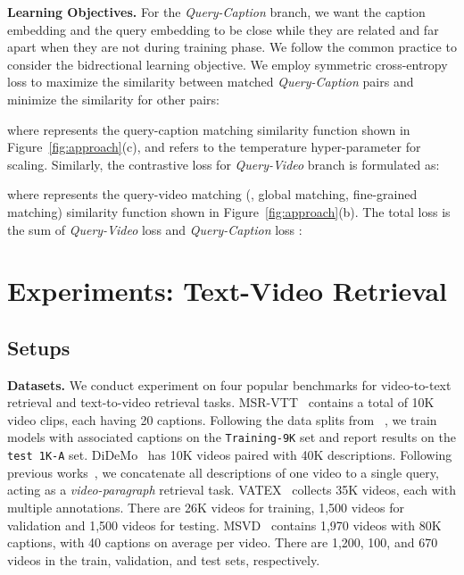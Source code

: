 \documentclass[10pt,twocolumn,letterpaper]{article}
\begin{document}
\textbf{Learning Objectives.} For the \emph{Query-Caption} branch, we want the caption embedding  and the query embedding  to be close while they are related and far apart when they are not during training phase. 
We follow the common practice \cite{luo2022clip4clip,wang2022disentangled} to consider the bidrectional learning objective. We employ symmetric cross-entropy loss to maximize the similarity between matched \emph{Query-Caption} pairs and minimize the similarity for other pairs: 

where  represents the query-caption matching similarity function shown in Figure~\ref{fig:approach}(c), and  refers to the temperature hyper-parameter for scaling. 
Similarly, the contrastive loss for \emph{Query-Video} branch is formulated as:

where  represents the query-video matching (\eg, global matching, fine-grained matching) similarity function shown in Figure~\ref{fig:approach}(b).
The total loss  is the sum of \emph{Query-Video} loss  and \emph{Query-Caption} loss :




 
\section{Experiments: Text-Video Retrieval}
\subsection{Setups}
\noindent\textbf{Datasets.} We conduct experiment on four popular benchmarks for video-to-text retrieval and text-to-video retrieval tasks.
MSR-VTT~\cite{xu2016msrvtt} contains a total of 10K video clips, each having 20 captions. Following the data splits from ~\cite{gabeur2020mmt, miech2019howto100m, luo2022clip4clip}, we train models with associated captions on the \texttt{Training-9K} set and report results on the \texttt{test 1K-A} set. 
DiDeMo~\cite{anne2017didemo} has 10K videos paired with 40K descriptions. Following previous works~\cite{luo2022clip4clip, bain2021frozen, lei2021clipbert}, we concatenate all descriptions of one video to a single query, acting as a \textit{video-paragraph} retrieval task.
VATEX~\cite{wang2019vatex} collects 35K videos, each with multiple annotations. There are 26K videos for training, 1,500 videos for validation and 1,500 videos for testing.
MSVD~\cite{wu2017msvd} contains 1,970 videos with 80K captions, with 40 captions on average per video. There are 1,200, 100, and 670 videos in the train, validation, and test sets, respectively.
\end{document}
